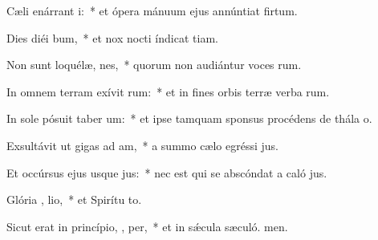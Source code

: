 \item Cæli enárrant  i:~* et ópera mánuum ejus annúntiat firtum.
\item Dies diéi  bum,~* et nox nocti índicat tiam.
\item Non sunt loquélæ,  nes,~* quorum non audiántur voces rum.
\item In omnem terram exívit  rum:~* et in fines orbis terræ verba rum.
\item In sole pósuit taber um:~* et ipse tamquam sponsus procédens de thála o.
\item Exsultávit ut gigas ad  am,~* a summo cælo egréssi jus.
\item Et occúrsus ejus usque   jus:~* nec est qui se abscóndat a caló jus.
\item Glória ,  lio,~* et Spirítu to.
\item Sicut erat in princípio,  ,  per,~* et in sǽcula sæculó. men.
